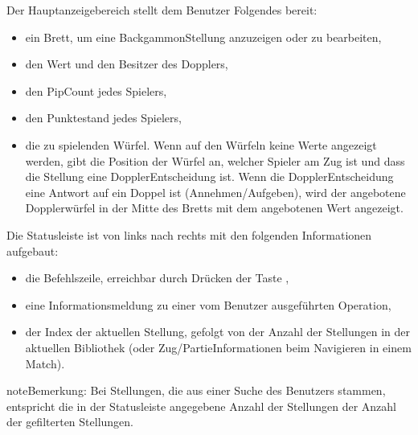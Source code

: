 \documentclass[letterpaper,10pt,german]{sphinxmanual}
\begin{document}
\sphinxAtStartPar
Der Hauptanzeigebereich stellt dem Benutzer Folgendes bereit:
\begin{itemize}
\item {} 
\sphinxAtStartPar
ein Brett, um eine Backgammon\sphinxhyphen{}Stellung anzuzeigen oder zu bearbeiten,

\item {} 
\sphinxAtStartPar
den Wert und den Besitzer des Dopplers,

\item {} 
\sphinxAtStartPar
den Pip\sphinxhyphen{}Count jedes Spielers,

\item {} 
\sphinxAtStartPar
den Punktestand jedes Spielers,

\item {} 
\sphinxAtStartPar
die zu spielenden Würfel. Wenn auf den Würfeln keine Werte angezeigt werden, gibt die Position der Würfel an, welcher Spieler am Zug ist und dass die Stellung eine Doppler\sphinxhyphen{}Entscheidung ist. Wenn die Doppler\sphinxhyphen{}Entscheidung eine Antwort auf ein Doppel ist (Annehmen/Aufgeben), wird der angebotene Dopplerwürfel in der Mitte des Bretts mit dem angebotenen Wert angezeigt.

\end{itemize}

\sphinxAtStartPar
Die Statusleiste ist von links nach rechts mit den folgenden Informationen aufgebaut:
\begin{itemize}
\item {} 
\sphinxAtStartPar
die Befehlszeile, erreichbar durch Drücken der Taste ,

\item {} 
\sphinxAtStartPar
eine Informationsmeldung zu einer vom Benutzer ausgeführten Operation,

\item {} 
\sphinxAtStartPar
der Index der aktuellen Stellung, gefolgt von der Anzahl der Stellungen in der aktuellen Bibliothek (oder Zug\sphinxhyphen{}/Partie\sphinxhyphen{}Informationen beim Navigieren in einem Match).

\end{itemize}

\begin{sphinxadmonition}{note}{Bemerkung:}
\sphinxAtStartPar
Bei Stellungen, die aus einer Suche des Benutzers stammen, entspricht die in der Statusleiste angegebene Anzahl der Stellungen der Anzahl der gefilterten Stellungen.
\end{sphinxadmonition}
\end{document}
